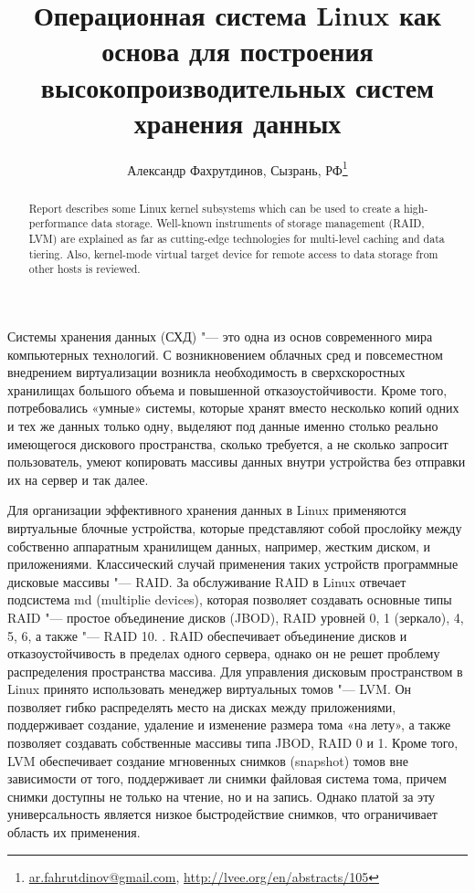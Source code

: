 \documentclass[10pt, a5paper]{article}
\begin{document}
\title{Операционная система Linux как основа для построения высокопроизводительных систем хранения данных}
\author{Александр Фахрутдинов, Сызрань, РФ\footnote{\url{ar.fahrutdinov@gmail.com}, \url{http://lvee.org/en/abstracts/105}}}
\maketitle
\begin{abstract}
Report describes some Linux kernel subsystems which can be used to create a high-performance data storage. Well-known instruments of storage management (RAID, LVM) are explained as far as cutting-edge technologies for multi-level caching and data tiering. Also, kernel-mode virtual target device  for remote access to data storage from other hosts is reviewed.
\end{abstract}
Системы хранения данных (СХД) "--- это одна из основ современного мира компьютерных технологий. С возникновением облачных сред и повсеместном внедрением виртуализации возникла необходимость в сверхскоростных хранилищах большого объема и повышенной  отказоустойчивости. Кроме того, потребовались «умные» системы, которые хранят вместо несколько копий одних и тех же данных только одну, выделяют под данные именно столько реально имеющегося дискового пространства, сколько требуется, а не сколько запросит пользователь, умеют копировать массивы данных внутри устройства без отправки их на сервер и так далее.

Для организации эффективного хранения данных в Linux применяются виртуальные блочные устройства, которые представляют собой прослойку между собственно аппаратным хранилищем данных, например, жестким диском, и приложениями. Классический случай применения таких устройств программные дисковые массивы "--- RAID. За   обслуживание  RAID в Linux отвечает подсистема md (multiplie devices), которая позволяет создавать основные типы RAID "--- простое объединение дисков (JBOD), RAID уровней 0, 1 (зеркало), 4, 5, 6, а также "--- RAID 10.
.
RAID обеспечивает объединение дисков и отказоустойчивость в пределах одного сервера, однако он не решет проблему распределения пространства массива. Для управления дисковым пространством в Linux принято использовать менеджер виртуальных томов "--- LVM. Он позволяет гибко распределять место на дисках между приложениями, поддерживает создание, удаление и изменение размера тома «на лету», а также позволяет создавать собственные массивы типа JBOD,  RAID 0 и 1. Кроме того, LVM обеспечивает создание мгновенных снимков (snapshot) томов вне зависимости от того, поддерживает ли снимки файловая система тома, причем снимки доступны не только на чтение, но и на запись.  Однако платой за эту универсальность является низкое быстродействие снимков, что ограничивает область их применения.
\end{document}
